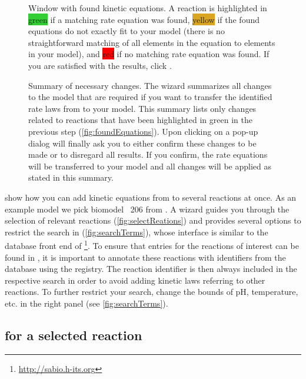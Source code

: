 \begin{figure}[b!]
\caption[Window with found kinetic equations for all reactions]{Window with found kinetic equations.
A reaction is highlighted in \colorbox{LimeGreen}{green} if a matching rate equation was found, \colorbox{Goldenrod}{yellow} if the found equations do not exactly fit to your model (there is no straightforward matching of all elements in the equation to elements in your model), and \colorbox{red}{red} if no matching rate equation was found.
If you are satisfied with the results, click .}
\label{fig:foundEquations}
\end{figure}
\begin{figure}[t!]
\caption[Summary of necessary changes]{Summary of necessary changes.
The wizard summarizes all changes to the model that are required if you want to transfer the identified rate laws from \SABIO to your model.
This summary lists only changes related to reactions that have been highlighted in green in the previous step (\vref{fig:foundEquations}).
Upon clicking on  a pop-up dialog will finally ask you to either confirm these changes to be made or to disregard all results.
If you confirm, the rate equations will be transferred to your model and all changes will be applied as stated in this summary.}
\label{fig:changes}
\end{figure}
 show how you can add kinetic equations from \SABIO to several reactions at once.
As an example model we pick biomodel \numero~206 from \BioModels \citep{Li2010a, Wolf2000}.
A wizard guides you through the selection of relevant reactions (\vref{fig:selectReations}) and provides several options to restrict the search in \SABIO (\vref{fig:searchTerms}), whose interface is similar to the database front end of \SABIO\footnote{\url{http://sabio.h-its.org}}.
To ensure that entries for the reactions of interest can be found in \SABIO, it is important to annotate these reactions with identifiers from the \KEGG database using the \MIRIAM registry.
The \KEGG reaction identifier is then always included in the respective search in order to avoid adding kinetic laws referring to other reactions.
To further restrict your search, change the bounds of pH, temperature, etc. in the right panel (see \vref{fig:searchTerms}).

\subsection{\SABIO for a selected reaction}

